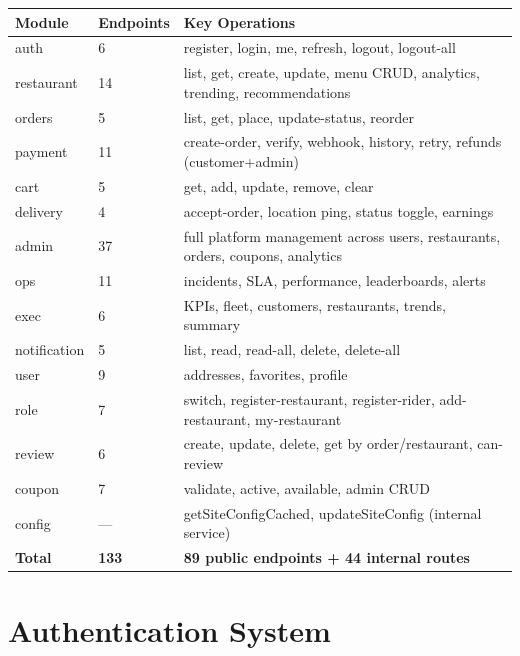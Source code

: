\documentclass[11pt,a4paper,twoside]{book}
\newcommand{\th}[1]{\textbf{\color{white}#1}}
\begin{document}
\begin{center}\small
\begin{longtable}{p{2.2cm}p{2cm}p{8.5cm}}
\toprule
\rowcolor{headbg}\th{Module} & \th{Endpoints} & \th{Key Operations} \\
\midrule
auth        & 6  & register, login, me, refresh, logout, logout-all \\
\rowcolor{rowalt}restaurant  & 14 & list, get, create, update, menu CRUD, analytics, trending, recommendations \\
orders      & 5  & list, get, place, update-status, reorder \\
\rowcolor{rowalt}payment     & 11 & create-order, verify, webhook, history, retry, refunds (customer+admin) \\
cart        & 5  & get, add, update, remove, clear \\
\rowcolor{rowalt}delivery    & 4  & accept-order, location ping, status toggle, earnings \\
admin       & 37 & full platform management across users, restaurants, orders, coupons, analytics \\
\rowcolor{rowalt}ops         & 11 & incidents, SLA, performance, leaderboards, alerts \\
exec        & 6  & KPIs, fleet, customers, restaurants, trends, summary \\
\rowcolor{rowalt}notification & 5 & list, read, read-all, delete, delete-all \\
user        & 9  & addresses, favorites, profile \\
\rowcolor{rowalt}role        & 7  & switch, register-restaurant, register-rider, add-restaurant, my-restaurant \\
review      & 6  & create, update, delete, get by order/restaurant, can-review \\
\rowcolor{rowalt}coupon      & 7  & validate, active, available, admin CRUD \\
config      & —  & getSiteConfigCached, updateSiteConfig (internal service) \\
\midrule
\textbf{Total} & \textbf{133} & \textbf{89 public endpoints + 44 internal routes} \\
\bottomrule
\end{longtable}
\end{center}

\section{Authentication System}
\end{document}
